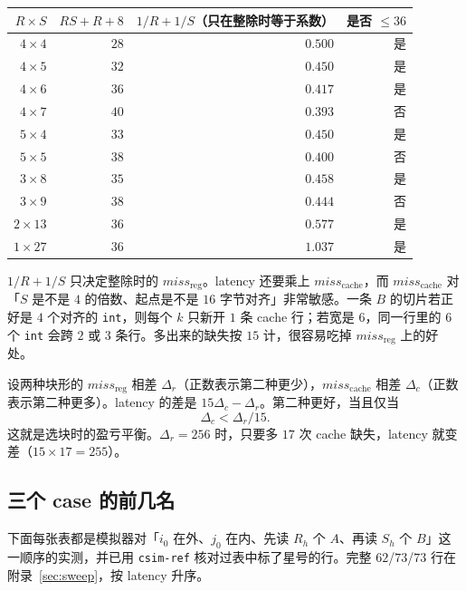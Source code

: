 \documentclass[11pt,a4paper,fontset=fandol]{ctexart}
\newcommand{\code}[1]{\texttt{#1}}
\newcommand{\mreg}{\mathit{miss}_{\mathrm{reg}}}
\newcommand{\mc}{\mathit{miss}_{\mathrm{cache}}}
\begin{document}
\begin{center}
\begin{tabular}{@{}rrrr@{}}
\toprule
$R\times S$ & $RS+R+8$ & $1/R+1/S$（只在整除时等于系数） & 是否 $\le 36$\\
\midrule
$4\times4$ & $28$ & $0.500$ & 是\\
$4\times5$ & $32$ & $0.450$ & 是\\
$4\times6$ & $36$ & $0.417$ & 是\\
$4\times7$ & $40$ & $0.393$ & 否\\
$5\times4$ & $33$ & $0.450$ & 是\\
$5\times5$ & $38$ & $0.400$ & 否\\
$3\times8$ & $35$ & $0.458$ & 是\\
$3\times9$ & $38$ & $0.444$ & 否\\
$2\times13$ & $36$ & $0.577$ & 是\\
$1\times27$ & $36$ & $1.037$ & 是\\
\bottomrule
\end{tabular}
\end{center}

$1/R+1/S$ 只决定整除时的 $\mreg$。latency 还要乘上 $\mc$，而 $\mc$ 对「$S$ 是不是 $4$ 的倍数、起点是不是 $16$ 字节对齐」非常敏感。一条 $B$ 的切片若正好是 $4$ 个对齐的 \code{int}，则每个 $k$ 只新开 $1$ 条 cache 行；若宽是 $6$，同一行里的 $6$ 个 \code{int} 会跨 $2$ 或 $3$ 条行。多出来的缺失按 $15$ 计，很容易吃掉 $\mreg$ 上的好处。

设两种块形的 $\mreg$ 相差 $\Delta_r$（正数表示第二种更少），$\mc$ 相差 $\Delta_c$（正数表示第二种更多）。latency 的差是 $15\Delta_c-\Delta_r$。第二种更好，当且仅当
\begin{equation}
\label{eq:be}
\Delta_c < \Delta_r/15.
\end{equation}
这就是选块时的盈亏平衡。$\Delta_r=256$ 时，只要多 $17$ 次 cache 缺失，latency 就变差（$15\times17=255$）。

\subsection{三个 case 的前几名}

下面每张表都是模拟器对「$i_0$ 在外、$j_0$ 在内、先读 $R_h$ 个 $A$、再读 $S_h$ 个 $B$」这一顺序的实测，并已用 \code{csim-ref} 核对过表中标了星号的行。完整 $62$/$73$/$73$ 行在附录~\ref{sec:sweep}，按 latency 升序。
\end{document}
